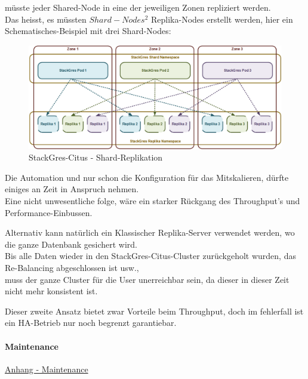 \begin{flushleft}
\begin{flushleft}
\begin{flushleft}
            müsste jeder Shared-Node in eine der jeweiligen Zonen repliziert werden.\\
            Das heisst, es müssten \(Shard-Nodes^2 \) Replika-Nodes erstellt werden, hier ein Schematisches-Beispiel mit drei Shard-Nodes:
            \begin{figure}[H]
                \centering
                \includegraphics[width=0.8\linewidth]{source/implementation/evaluation/postgresql_ha_solutions/stackgres/stackgres_shard_replication}
                \caption{StackGres-Citus - Shard-Replikation}
                \label{fig:stackgres_shard_replication}
            \end{figure}
            Die Automation und nur schon die Konfiguration für das Mitskalieren, dürfte einiges an Zeit in Anspruch nehmen.\\
            Eine nicht unwesentliche folge, wäre ein starker Rückgang des Throughput's und Performance-Einbussen.
        \end{flushleft}
        \begin{flushleft}
            Alternativ kann natürlich ein Klassischer Replika-Server verwendet werden, wo die ganze Datenbank gesichert wird.\\
            Bis alle Daten wieder in den StackGres-Citus-Cluster zurückgeholt wurden, das Re-Balancing abgeschlossen ist usw.,\\
            muss der ganze Cluster für die User unerreichbar sein, da dieser in dieser Zeit nicht mehr konsistent ist.
        \end{flushleft}
        \begin{flushleft}
            Dieser zweite Ansatz bietet zwar Vorteile beim Throughput, doch im fehlerfall ist ein HA-Betrieb nur noch begrenzt garantiebar.
        \end{flushleft}
    \end{flushleft}
\end{flushleft}
\begin{flushleft}
    \paragraph{Maintenance}
    \hyperref[subsec:maintenance_stackgres_citus]{Anhang - Maintenance}
\end{flushleft}